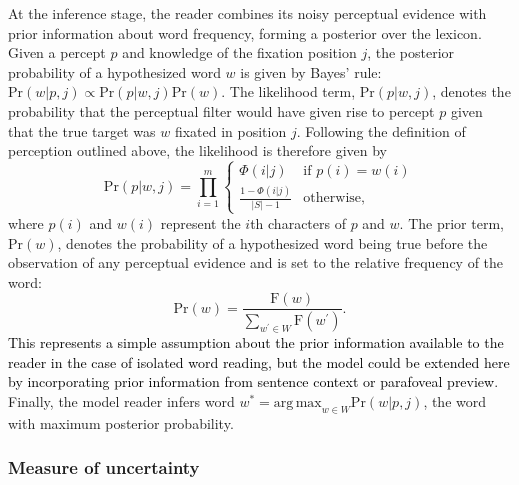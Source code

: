 \documentclass[doc,biblatex]{apa7}
\newcommand\newmaterial[1]{\textcolor{black}{#1}}
\begin{document}
At the inference stage, the reader combines its noisy perceptual evidence with prior information about word frequency, forming a posterior over the lexicon. Given a percept $p$ and knowledge of the fixation position $j$, the posterior probability of a hypothesized word $w$ is given by Bayes' rule: $\mathrm{Pr}(w|p,j) \propto \mathrm{Pr}(p|w,j) \mathrm{Pr}(w)$. The likelihood term, $\mathrm{Pr}(p|w,j)$, denotes the probability that the perceptual filter would have given rise to percept $p$ given that the true target was $w$ fixated in position $j$. Following the definition of perception outlined above, the likelihood is therefore given by
\begin{equation}
\mathrm{Pr}(p|w,j) = \prod_{i=1}^m
\begin{cases}
       \Phi(i|j)                   & \text{if $p(i) = w(i)$} \\
       \frac{1 - \Phi(i|j)}{|S|-1} & \text{otherwise,}
\end{cases}
\label{likelihood}
\end{equation}
where $p(i)$ and $w(i)$ represent the $i$th characters of $p$ and $w$. The prior term, $\mathrm{Pr}(w)$, denotes the probability of a hypothesized word being true before the observation of any perceptual evidence and is set to the relative frequency of the word:
\begin{equation}
\mathrm{Pr}(w) = \frac{\mathrm{F}(w)}{\sum_{w^\prime \in W} \mathrm{F}(w^\prime)}.
\label{prior}
\end{equation}
\newmaterial{This represents a simple assumption about the prior information available to the reader in the case of isolated word reading, but the model could be extended here by incorporating prior information from sentence context or parafoveal preview}. Finally, the model reader infers word $w^\ast = \mathrm{arg\,max}_{w \in W} \mathrm{Pr}(w|p,j)$, the word with maximum posterior probability.

\subsubsection{Measure of uncertainty}
\end{document}
